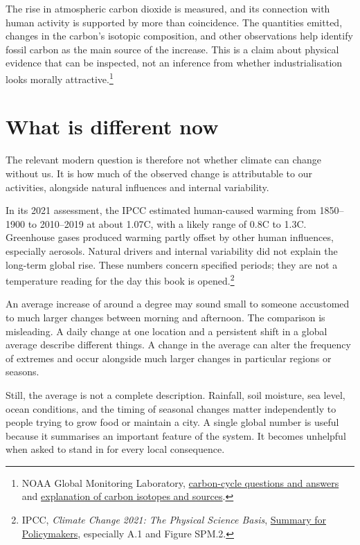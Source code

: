 \documentclass[12pt,a4paper]{book}
\begin{document}
The rise in atmospheric carbon dioxide is measured, and its connection with human activity is supported by more than coincidence. The quantities emitted, changes in the carbon's isotopic composition, and other observations help identify fossil carbon as the main source of the increase. This is a claim about physical evidence that can be inspected, not an inference from whether industrialisation looks morally attractive.\footnote{NOAA Global Monitoring Laboratory, \href{https://gml.noaa.gov/infodata/faq_cat-3.html}{carbon-cycle questions and answers} and \href{https://www.gml.noaa.gov/outreach/isotopes/mixing.html}{explanation of carbon isotopes and sources}.}

\section*{What is different now}

The relevant modern question is therefore not whether climate can change without us. It is how much of the observed change is attributable to our activities, alongside natural influences and internal variability.

In its 2021 assessment, the IPCC estimated human-caused warming from 1850--1900 to 2010--2019 at about 1.07\textdegree{}C, with a likely range of 0.8\textdegree{}C to 1.3\textdegree{}C. Greenhouse gases produced warming partly offset by other human influences, especially aerosols. Natural drivers and internal variability did not explain the long-term global rise. These numbers concern specified periods; they are not a temperature reading for the day this book is opened.\footnote{IPCC, \emph{Climate Change 2021: The Physical Science Basis}, \href{https://www.ipcc.ch/site/assets/uploads/2021/09/Doc_4_Rev_2_AR6_WGI_Approved_Summary_for_Policymarkers.pdf}{Summary for Policymakers}, especially A.1 and Figure SPM.2.}

An average increase of around a degree may sound small to someone accustomed to much larger changes between morning and afternoon. The comparison is misleading. A daily change at one location and a persistent shift in a global average describe different things. A change in the average can alter the frequency of extremes and occur alongside much larger changes in particular regions or seasons.

Still, the average is not a complete description. Rainfall, soil moisture, sea level, ocean conditions, and the timing of seasonal changes matter independently to people trying to grow food or maintain a city. A single global number is useful because it summarises an important feature of the system. It becomes unhelpful when asked to stand in for every local consequence.
\end{document}
